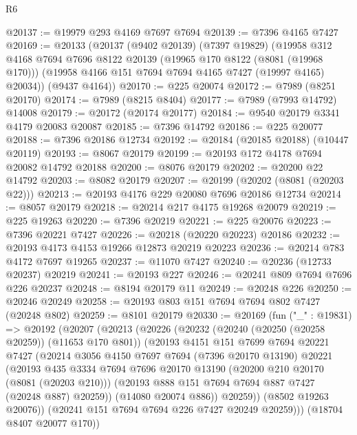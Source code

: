 \begin{lexlean}{R6}
\begin{coremodule}
@20137 := @19979 @293 @4169 @7697 @7694
@20139 := @7396 @4165 @7427
@20169 := @20133
    (@20137
      (@9402 @20139)
      (@7397 @19829)
      (@19958
        @312
        @4168
        @7694
        @7696
        @8122
        @20139
        (@19965 @170 @8122 (@8081 (@19968 @170)))
        (@19958 @4166 @151 @7694 @7694 @4165 @7427 (@19997 @4165) @20034))
      (@9437 @4164))
@20170 := @225 @20074
@20172 := @7989 (@8251 @20170)
@20174 := @7989 (@8215 @8404)
@20177 := @7989 (@7993 @14792) @14008
@20179 := @20172 (@20174 @20177)
@20184 := @9540 @20179 @3341 @4179 @20083 @20087
@20185 := @7396 @14792
@20186 := @225 @20077
@20188 := @7396 @20186 @12734
@20192 := @20184 (@20185 @20188) (@10447 @20119)
@20193 := @8067 @20179
@20199 := @20193 @172 @4178 @7694 @20082 @14792 @20188
@20200 := @8076 @20179
@20202 := @20200 @22 @14792
@20203 := @8082 @20179
@20207 := @20199 (@20202 (@8081 (@20203 @22)))
@20213 := @20193 @4176 @229 @20080 @7696 @20186 @12734
@20214 := @8057 @20179
@20218 := @20214 @217 @4175 @19268 @20079
@20219 := @225 @19263
@20220 := @7396 @20219
@20221 := @225 @20076
@20223 := @7396 @20221 @7427
@20226 := @20218 (@20220 @20223) @20186
@20232 := @20193 @4173 @4153 @19266 @12873 @20219 @20223
@20236 := @20214 @783 @4172 @7697 @19265
@20237 := @11070 @7427
@20240 := @20236 (@12733 @20237) @20219
@20241 := @20193 @227
@20246 := @20241 @809 @7694 @7696 @226 @20237
@20248 := @8194 @20179 @11
@20249 := @20248 @226
@20250 := @20246 @20249
@20258 := @20193 @803 @151 @7694 @7694 @802 @7427 (@20248 @802)
@20259 := @8101 @20179
@20330 := @20169
    (fun ("_" : @19831) =>
    @20192
      (@20207
        (@20213
          (@20226
            (@20232
              (@20240 (@20250 (@20258 @20259)) (@11653 @170 @801))
              (@20193
                @4151
                @151
                @7699
                @7694
                @20221
                @7427
                (@20214
                  @3056
                  @4150
                  @7697
                  @7694
                  (@7396 @20170 @13190)
                  @20221
                  (@20193
                    @435
                    @3334
                    @7694
                    @7696
                    @20170
                    @13190
                    (@20200 @210 @20170 (@8081 (@20203 @210)))
                    (@20193 @888 @151 @7694 @7694 @887 @7427 (@20248 @887) @20259))
                  (@14080 @20074 @886))
                @20259))
            (@8502 @19263 @20076))
          (@20241 @151 @7694 @7694 @226 @7427 @20249 @20259)))
      (@18704 @8407 @20077 @170))

\end{coremodule}
\end{lexlean}

